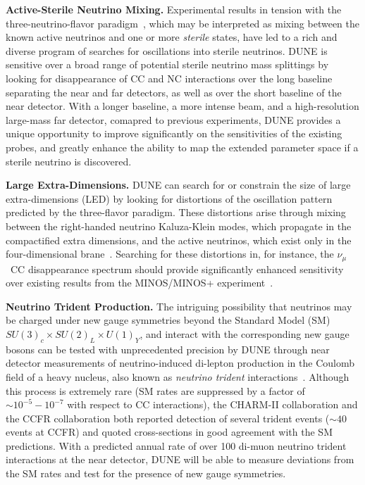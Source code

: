 {\bf Active-Sterile Neutrino Mixing.}
Experimental results in tension with the three-neutrino-flavor paradigm~\cite{LSNDSterile,MiniBooNESterile,GalliumSummary,ReactorSummary}, which may be interpreted as mixing between the known active neutrinos and one or more {\it sterile} states, have led to a rich and diverse program of searches for oscillations into sterile neutrinos.
DUNE is sensitive over a broad range of potential sterile neutrino mass splittings by looking for disappearance of CC and NC interactions over the long baseline separating the near and far detectors, as well as over the short baseline of the near detector. 
With a longer baseline, a more intense beam, and a high-resolution large-mass far detector, comapred to previous experiments, DUNE provides a unique opportunity to improve significantly on the sensitivities of the existing probes, and greatly enhance the ability to map the extended parameter space if a sterile neutrino is discovered.

{\bf Large Extra-Dimensions.}
DUNE can search for or constrain the size of large extra-dimensions (LED) by looking for distortions of the oscillation pattern predicted by the three-flavor paradigm. These distortions arise through mixing between the right-handed neutrino Kaluza-Klein modes, which propagate in the compactified extra dimensions, and the active neutrinos, which exist only in the four-dimensional brane~\cite{LEDModel}. Searching for these distortions in, for instance, the $\nu_\mu$~CC disappearance spectrum should provide significantly enhanced sensitivity over existing results from the MINOS/MINOS+ experiment~\cite{MinosplusLED}.

{\bf Neutrino Trident Production.}
The intriguing possibility that neutrinos may be charged under new gauge symmetries beyond the Standard Model (SM) $SU(3)_c\times SU(2)_L\times U(1)_Y$, and interact with the corresponding new gauge bosons can be tested with unprecedented precision by DUNE through near detector measurements of neutrino-induced di-lepton production in the Coulomb field of a heavy nucleus, also known as {\it neutrino trident} interactions~\cite{Altmannshofer:2014pba}. Although this process is extremely rare (SM rates are suppressed by a factor of $\sim 10^{-5}-10^{-7}$ with respect to CC interactions), the CHARM-II collaboration \cite{Geiregat:1990gz} and the CCFR collaboration \cite{Mishra:1991bv} both reported detection of several trident events ($\sim 40$ events at CCFR) and quoted cross-sections in good agreement with the SM predictions. With a predicted annual rate of over 100 di-muon neutrino trident interactions at the near detector, DUNE will be able to measure deviations from the SM rates and test for the presence of new gauge symmetries.



